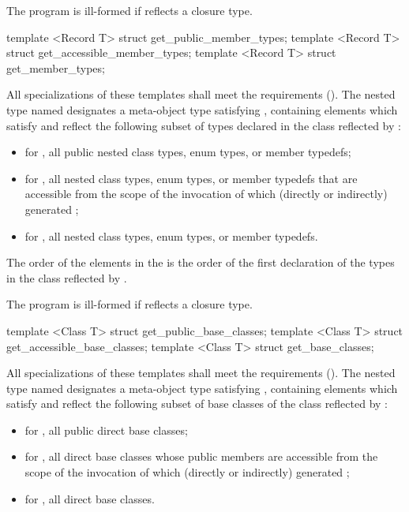 \begin{std.txt}
\begin{itemdescr}
\pnum
\remarks
The program is ill-formed if  reflects a closure type.
\end{itemdescr}

\begin{itemdecl}
template <Record T> struct get_public_member_types;
template <Record T> struct get_accessible_member_types;
template <Record T> struct get_member_types;
\end{itemdecl}

\begin{itemdescr}
\pnum
All specializations of these templates shall meet the  requirements (). The nested type named  designates a meta-object type satisfying , containing elements which satisfy  and reflect the following subset of types declared in the class reflected by :
\begin{itemize}
  \item for , all public nested class types, enum types, or member typedefs;
  \item for , all nested class types, enum types, or member typedefs that are accessible from the scope of the invocation of  which (directly or indirectly) generated ;
  \item for , all nested class types, enum types, or member typedefs.
\end{itemize}

\pnum
The order of the elements in the  is the order of the first declaration of the types in the class reflected by .

\pnum
\remarks
The program is ill-formed if  reflects a closure type.
\end{itemdescr}

\begin{itemdecl}
template <Class T> struct get_public_base_classes;
template <Class T> struct get_accessible_base_classes;
template <Class T> struct get_base_classes;
\end{itemdecl}

\begin{itemdescr}
\pnum
All specializations of these templates shall meet the  requirements (). The nested type named  designates a meta-object type satisfying , containing elements which satisfy  and reflect the following subset of base classes of the class reflected by :
\begin{itemize}
  \item for , all public direct base classes;
  \item for , all direct base classes whose public members are accessible from the scope of the invocation of  which (directly or indirectly) generated ;
  \item for , all direct base classes.
\end{itemize}


\end{itemdescr}
\end{std.txt}
